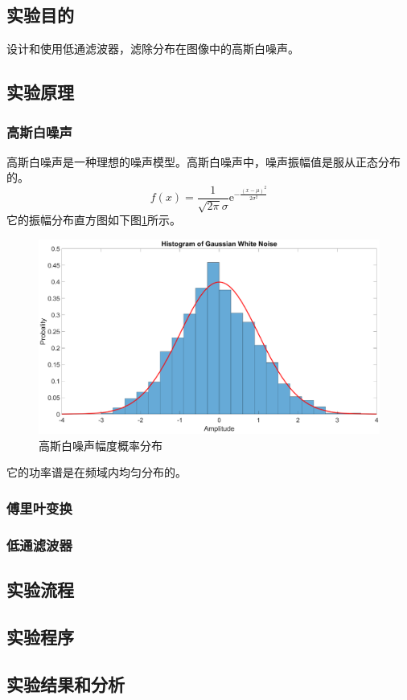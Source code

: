 \subsection{实验目的}
设计和使用低通滤波器，滤除分布在图像中的高斯白噪声。
\subsection{实验原理}
\subsubsection{高斯白噪声}
高斯白噪声是一种理想的噪声模型。高斯白噪声中，噪声振幅值是服从正态分布的。
\[ f(x)=\frac{1}{\sqrt{2\pi}\sigma}\mathrm{e}^{-\frac{(x-\mu)^2}{2\sigma^2}} \]
它的振幅分布直方图如下图\ref{fig:gwnhistogram}所示。
\begin{figure}[H]
	\centering
	\includegraphics[width=0.7\linewidth]{figure/gwn_histogram}
	\caption{高斯白噪声幅度概率分布}
	\label{fig:gwnhistogram}
\end{figure}

它的功率谱是在频域内均匀分布的。
\subsubsection{傅里叶变换}
\subsubsection{低通滤波器}
\subsection{实验流程}
\subsection{实验程序}
\subsection{实验结果和分析}